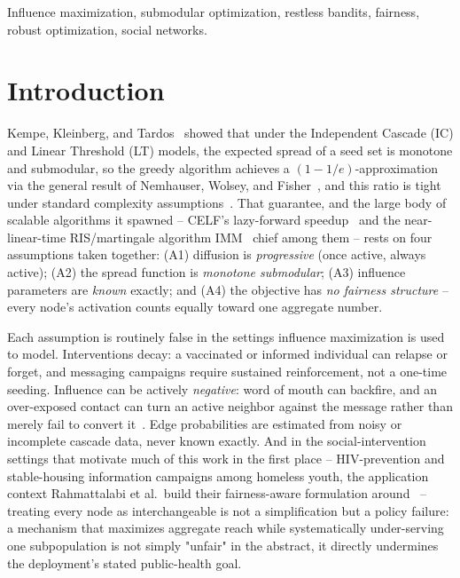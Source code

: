 \documentclass[journal]{IEEEtran}
\begin{document}
\begin{IEEEkeywords}
Influence maximization, submodular optimization, restless bandits, fairness,
robust optimization, social networks.
\end{IEEEkeywords}

\section{Introduction}

Kempe, Kleinberg, and Tardos~\cite{kempe2003maximizing} showed that under the
Independent Cascade (IC) and Linear Threshold (LT) models, the expected spread
of a seed set is monotone and submodular, so the greedy algorithm achieves a
$(1-1/e)$-approximation via the general result of Nemhauser, Wolsey, and
Fisher~\cite{nemhauser1978analysis}, and this ratio is tight under standard
complexity assumptions~\cite{feige1998threshold}. That guarantee, and the
large body of scalable algorithms it spawned -- CELF's lazy-forward
speedup~\cite{leskovec2007cost} and the near-linear-time RIS/martingale
algorithm IMM~\cite{tang2015influence,borgs2014maximizing} chief among them --
rests on four assumptions taken together: (A1) diffusion is
\emph{progressive} (once active, always active); (A2) the spread function is
\emph{monotone submodular}; (A3) influence parameters are \emph{known}
exactly; and (A4) the objective has \emph{no fairness structure} -- every
node's activation counts equally toward one aggregate number.

Each assumption is routinely false in the settings influence maximization is
used to model. Interventions decay: a vaccinated or informed individual can
relapse or forget, and messaging campaigns require sustained reinforcement,
not a one-time seeding. Influence can be actively \emph{negative}: word of
mouth can backfire, and an over-exposed contact can turn an active neighbor
against the message rather than merely fail to convert
it~\cite{chen2011influence,he2012influence,li2014influence}. Edge
probabilities are estimated from noisy or incomplete cascade data, never
known exactly. And in the social-intervention settings that motivate much of
this work in the first place -- HIV-prevention and stable-housing
information campaigns among homeless youth, the application context
Rahmattalabi et al.\ build their fairness-aware
formulation around~\cite{rahmattalabi2021fair} -- treating every node as
interchangeable is not a simplification but a policy failure: a mechanism
that maximizes aggregate reach while systematically under-serving one
subpopulation is not simply "unfair" in the abstract, it directly
undermines the deployment's stated public-health goal.
\end{document}
